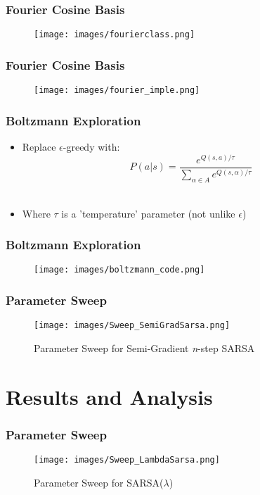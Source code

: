 \documentclass{beamer}
\begin{document}
\begin{frame}
    \frametitle{Fourier Cosine Basis}
    \begin{figure}
        \texttt{[image: images/fourierclass.png]}
    \end{figure}
\end{frame}

\begin{frame}
    \frametitle{Fourier Cosine Basis}
    \begin{figure}
        \texttt{[image: images/fourier\_imple.png]}
    \end{figure}
\end{frame}

\begin{frame}
    \frametitle{Boltzmann Exploration}
    \begin{itemize}
        \item Replace \(\epsilon\)-greedy with: \\[2em]
        \[ P(a|s) = \frac{e^{Q(s,a)/\tau}}{\sum_{\alpha\in A} e^{Q(s,\alpha)/\tau}} \] \\[2em]
        \item Where \(\tau\) is a 'temperature' parameter (not unlike \(\epsilon\))
    \end{itemize}
\end{frame}

\begin{frame}
    \frametitle{Boltzmann Exploration}
    \begin{figure}
        \texttt{[image: images/boltzmann\_code.png]}
    \end{figure}
\end{frame}

\begin{frame}
    \frametitle{Parameter Sweep}
    \begin{figure}
        \texttt{[image: images/Sweep\_SemiGradSarsa.png]}
        \caption{Parameter Sweep for Semi-Gradient \emph{n}-step SARSA}
        \label{fig:SemiGrad_SARSA_Sweep}
    \end{figure}
\end{frame}

\section{Results and Analysis}

\begin{frame}
    \frametitle{Parameter Sweep}
    \begin{figure}
        \texttt{[image: images/Sweep\_LambdaSarsa.png]}
        \caption{Parameter Sweep for SARSA(\(\lambda\))}
        \label{fig:SARSA_Lambda_Sweep}
    \end{figure}
\end{frame}
\end{document}
